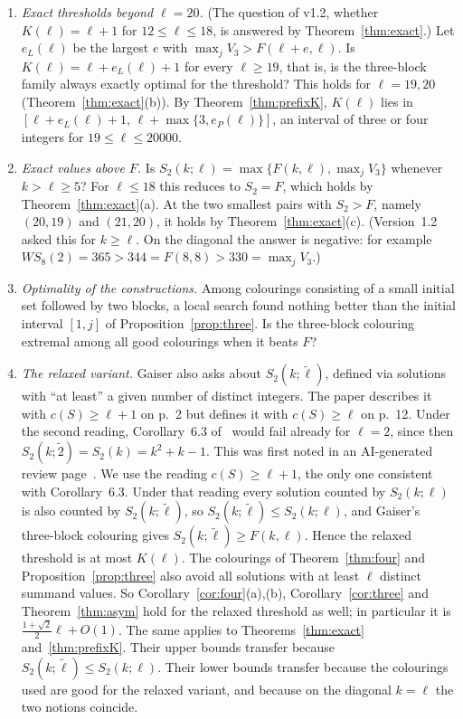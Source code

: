 \documentclass[11pt]{amsart}
\theoremstyle{definition}
\newcommand{\F}{F}
\newcommand{\Stwo}{S_2}
\begin{document}
\begin{enumerate}[label=\arabic*.]
\item \emph{Exact thresholds beyond $\ell=20$.} (The question of v1.2, whether $K(\ell)=\ell+1$ for $12\le\ell\le18$, is answered by Theorem~\ref{thm:exact}.) Let $e_L(\ell)$ be the largest $e$ with $\max_jV_3>\F(\ell+e,\ell)$. Is $K(\ell)=\ell+e_L(\ell)+1$ for every $\ell\ge19$, that is, is the three-block family always exactly optimal for the threshold? This holds for $\ell=19,20$ (Theorem~\ref{thm:exact}(b)). By Theorem~\ref{thm:prefixK}, $K(\ell)$ lies in $[\ell+e_L(\ell)+1,\,\ell+\max\{3,e_P(\ell)\}]$, an interval of three or four integers for $19\le\ell\le20000$.
\item \emph{Exact values above $\F$.} Is $\Stwo(k;\ell)=\max\{\F(k,\ell),\max_jV_3\}$ whenever $k>\ell\ge5$? For $\ell\le18$ this reduces to $\Stwo=\F$, which holds by Theorem~\ref{thm:exact}(a). At the two smallest pairs with $\Stwo>\F$, namely $(20,19)$ and $(21,20)$, it holds by Theorem~\ref{thm:exact}(c). (Version~1.2 asked this for $k\ge\ell$. On the diagonal the answer is negative: for example $WS_8(2)=365>344=\F(8,8)>330=\max_jV_3$.)
\item \emph{Optimality of the constructions.} Among colourings consisting of a small initial set followed by two blocks, a local search found nothing better than the initial interval $[1,j]$ of Proposition~\ref{prop:three}. Is the three-block colouring extremal among all good colourings when it beats $\F$?
\item \emph{The relaxed variant.} Gaiser also asks about $\Stwo(k;\tilde\ell)$, defined via solutions with ``at least'' a given number of distinct integers. The paper describes it with $c(S)\ge\ell+1$ on p.~2 but defines it with $c(S)\ge\ell$ on p.~12. Under the second reading, Corollary~6.3 of~\cite{Gaiser} would fail already for $\ell=2$, since then $\Stwo(k;\tilde2)=S_2(k)=k^2+k-1$. This was first noted in an AI-generated review page~\cite{pith}. We use the reading $c(S)\ge\ell+1$, the only one consistent with Corollary~6.3. Under that reading every solution counted by $\Stwo(k;\ell)$ is also counted by $\Stwo(k;\tilde\ell)$, so $\Stwo(k;\tilde\ell)\le\Stwo(k;\ell)$, and Gaiser's three-block colouring gives $\Stwo(k;\tilde\ell)\ge\F(k,\ell)$. Hence the relaxed threshold is at most $K(\ell)$. The colourings of Theorem~\ref{thm:four} and Proposition~\ref{prop:three} also avoid all solutions with at least $\ell$ distinct summand values. So Corollary~\ref{cor:four}(a),(b), Corollary~\ref{cor:three} and Theorem~\ref{thm:asym} hold for the relaxed threshold as well; in particular it is $\frac{1+\sqrt2}{2}\ell+O(1)$. The same applies to Theorems~\ref{thm:exact} and~\ref{thm:prefixK}. Their upper bounds transfer because $\Stwo(k;\tilde\ell)\le\Stwo(k;\ell)$. Their lower bounds transfer because the colourings used are good for the relaxed variant, and because on the diagonal $k=\ell$ the two notions coincide.
\end{enumerate}
\end{document}
